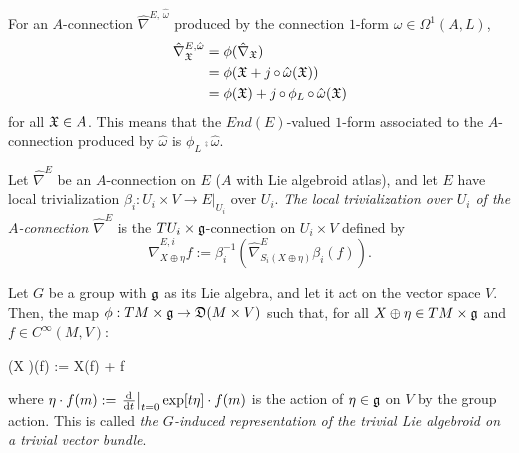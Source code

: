 For an $A$-connection $\hat \nabla^{E, \, \hat \omega}$ produced by the connection $1$-form $\hat \omega \in \Omega^1(A, L)$, 
\begin{align*}
    \hat \nabla^{E, \hat \omega}_{\oid X} &= \phi(\hat \nabla_{\oid X})\\
        &= \phi(\oid X + j \comp \hat \omega(\oid X)) \\
        &= \phi(\oid X) + j \comp \phi_L \comp \hat \omega (\oid X)
\end{align*}
for all $\mathfrak{X} \in A$. This means that the $End(E)$-valued $1$-form associated to the $A$-connection produced by $\hat \omega$ is $\phi_L \comp \hat \omega$.

\begin{definition}\label{definitionLocalTrivializationOfACOnnectionTransitiveLieAlgebroidComponents}
Let $\hat \nabla^E$ be an $A$-connection on $E$ ($A$ with Lie algebroid atlas), and let $E$ have local trivialization $\beta_i: U_i \times V\to E|_{U_i}$ over $U_i$. \emph{The local trivialization over $U_i$ of the $A$-connection $\hat \nabla^E$} is the $TU_i \times \mathfrak{g}$-connection on $U_i \times V$ defined by 
\begin{equation}
    \hat \nabla^{E, i}_{X \oplus \eta} f := \beta_i^{-1}(\hat \nabla_{S_i(X \oplus \eta)}^E \beta_i(f)).
\end{equation}
\end{definition}


\begin{example}
Let $G$ be a group with $\mathfrak{g}$ as its Lie algebra, and let it act on the vector space $V$. Then, the map $\phi: TM \times \alg g \to \alg D(M \times V)$ such that, for all $X \oplus \eta \in TM \times \mathfrak{g}$ and $f \in C^\infty(M, V)$:
\begin{eqnsplit}
    \phi(X \oplus \eta)(f) := X(f) + \eta \cdot f
\end{eqnsplit}
where $\eta \cdot f(m) := \der{t}[t=0]{\exp[t \eta] \cdot f(m)}$ is the action of $\eta \in \mathfrak{g}$ on $V$ by the group action. This is called \emph{the $G$-induced representation of the trivial Lie algebroid on a trivial vector bundle}.
\end{example}

